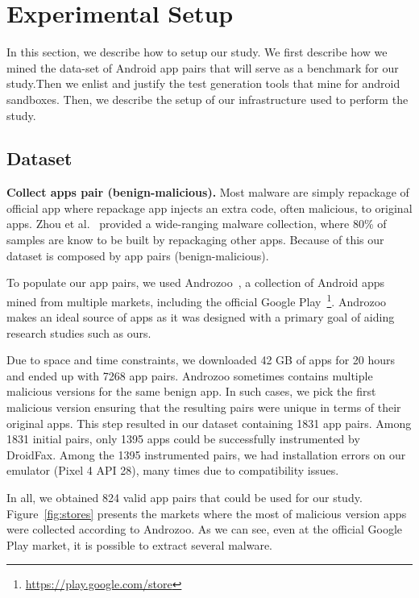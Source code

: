 \section{Experimental Setup}\label{sec:experimentalSetup}

In this section, we describe how to setup our study. We first describe how we mined the data-set of Android app pairs that will serve as a benchmark for our study.Then we enlist and justify the test generation tools that mine for android sandboxes. Then, we describe the setup of our infrastructure used to perform the study. 

\subsection{Dataset}
\textbf{Collect apps pair (benign-malicious).} Most malware are simply repackage of official app where repackage app injects an extra code, often malicious, to original apps. Zhou et al.~\cite{DBLP:conf/sp/ZhouJ12} provided a wide-ranging malware collection, where 80\% of samples are know to be built by repackaging other apps. Because of this our dataset is composed by app pairs (benign-malicious).


To populate our app pairs, we used Androzoo~\cite{DBLP:conf/msr/AllixBKT16}, a collection of Android apps mined from multiple markets, including the official Google Play~\footnote{\url{https://play.google.com/store}}. Androzoo makes an ideal source of apps as it was designed with a primary goal of aiding research studies such as ours. 

Due to space and time constraints, we downloaded 42 GB of apps for 20 hours and ended up with 7268 app pairs. Androzoo sometimes contains multiple malicious versions for the same benign app. In such cases, we pick the first malicious version ensuring that the resulting pairs were unique in terms of their original apps. This step resulted in our dataset containing 1831 app pairs. Among 1831 initial pairs, only 1395 apps could be successfully instrumented by DroidFax. Among the 1395 instrumented pairs, we had installation errors on our emulator (Pixel 4 API 28), many times due to compatibility issues. 

In all, we obtained 824 valid app pairs that could be used for our study. Figure~\ref{fig:stores} presents the markets where the most of malicious version apps were collected according to Androzoo. As we can see, even at the official Google Play market, it is possible to extract several malware.


